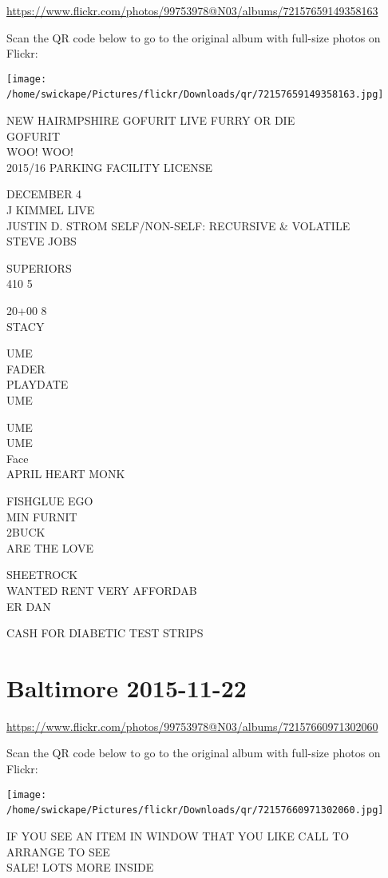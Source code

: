 \documentclass[10pt,letterpaper]{article}
\begin{document}
\url{https://www.flickr.com/photos/99753978@N03/albums/72157659149358163}

Scan the QR code below to go to the original album with full-size photos on Flickr:

\texttt{[image: /home/swickape/Pictures/flickr/Downloads/qr/72157659149358163.jpg]}
\

NEW HAIRMPSHIRE GOFURIT LIVE FURRY OR DIE\\
GOFURIT\\
WOO!  WOO!\\
2015/16 PARKING FACILITY LICENSE

DECEMBER 4\\
J KIMMEL LIVE\\
JUSTIN D. STROM SELF/NON{-}SELF: RECURSIVE \& VOLATILE\\
STEVE JOBS

SUPERIORS\\
410 5

20+00 8\\
STACY

UME\\
FADER\\
PLAYDATE\\
UME

UME\\
UME\\
Face\\
APRIL HEART MONK

FISHGLUE EGO\\
MIN FURNIT\\
2BUCK\\
ARE THE LOVE

SHEETROCK\\
WANTED RENT VERY AFFORDAB\\
ER DAN

CASH FOR DIABETIC TEST STRIPS
\

\section*{Baltimore 2015-11-22}

\url{https://www.flickr.com/photos/99753978@N03/albums/72157660971302060}

Scan the QR code below to go to the original album with full-size photos on Flickr:

\texttt{[image: /home/swickape/Pictures/flickr/Downloads/qr/72157660971302060.jpg]}
\

IF YOU SEE AN ITEM IN WINDOW THAT YOU LIKE CALL TO ARRANGE TO SEE\\
SALE!  LOTS MORE INSIDE
\end{document}
